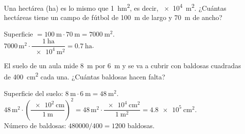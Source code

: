 \begin{exercise}
    Una hectárea (\unit{\hectare}) es lo mismo que \qty{1}{\square\hecto\m}, es decir, \qty{e4}{\square\m}. ¿Cuántas hectáreas tiene un campo de fútbol de \qty{100}{\m} de largo y \qty{70}{\m} de ancho?
    \begin{solu}
        Superficie \(= \qty{100}{\m} \cdot \qty{70}{\m} = \qty{7000}{\square\m}\). \\
        \(\num{7000}\,\unit{\square\m} \cdot \dfrac{\qty{1}{\hectare}}{\qty{e4}{\square\m}} = \qty{0.7}{\hectare}\).
    \end{solu}
\end{exercise}

\begin{exercise}
    El suelo de un aula mide \qty{8}{\m} por \qty{6}{\m} y se va a cubrir con baldosas cuadradas de \qty{400}{\square\cm} cada una. ¿Cuántas baldosas hacen falta?
    \begin{solu}
        Superficie del suelo: \(\qty{8}{\m} \cdot \qty{6}{\m} = \qty{48}{\square\m}\). \\
        \(\num{48}\,\unit{\square\m} \cdot \left(\dfrac{\qty{e2}{\cm}}{\qty{1}{\m}}\right)^{2} = \num{48}\,\unit{\square\m} \cdot \dfrac{\qty{e4}{\square\cm}}{\qty{1}{\square\m}} = \qty{4.8e5}{\square\cm}\). \\
        Número de baldosas: \(\num{480000} / \num{400} = \num{1200}\) baldosas.
    \end{solu}
\end{exercise}

